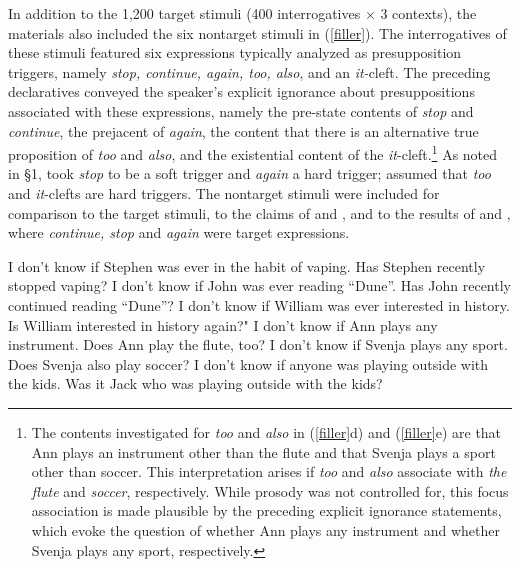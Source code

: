 \documentclass[11pt,fleqn]{article}
\newcommand{\6}{\mbox{$[\hspace*{-.6mm}[$}}
\newcommand{\9}{\mbox{$]\hspace*{-.6mm}]$}}
\begin{document}
In addition to the 1,200 target stimuli (400 interrogatives $\times$ 3 contexts), the materials also included the six nontarget stimuli in (\ref{filler}). The interrogatives of these stimuli featured six expressions typically analyzed as presupposition triggers, namely {\em stop, continue, again, too, also}, and an {\em it-}cleft. The preceding declaratives conveyed the speaker's explicit ignorance about presuppositions associated with these expressions, namely the pre-state contents of \emph{stop} and \emph{continue}, the prejacent of \emph{again}, the content that there is an alternative true proposition of \emph{too} and \emph{also}, and the existential content of the \emph{it}-cleft.\footnote{The contents investigated for {\em too} and {\em also} in (\ref{filler}d) and (\ref{filler}e) are that Ann plays an instrument other than the flute and that Svenja plays a sport other than soccer. This interpretation arises if {\em too} and {\em also} associate with {\em the flute} and {\em soccer}, respectively. While prosody was not controlled for, this focus association is made plausible by the preceding explicit ignorance statements, which evoke the question of whether Ann plays any instrument and whether Svenja plays any sport, respectively.}  As noted in \S1, \citealt{simons01} took {\em stop} to be a soft trigger and \emph{again} a hard trigger; \citealt{abusch10} assumed that \emph{too} and \emph{it}-clefts are hard triggers. The nontarget stimuli were included for comparison to the target stimuli, to the claims of \citealt{simons01} and \citealt{abusch10}, and to the results of \citealt[Exp.~3]{mandelkern-etal2020} and \citealt[Exps.~1-2]{kalomoiros-schwarz2024}, where  \emph{continue, stop} and \emph{again} were target expressions. 


\begin{exe}
\ex\label{filler} 
\begin{xlist}
\ex I don't know if Stephen was ever in the habit of vaping. Has Stephen recently stopped vaping?
\ex I don't know if John was ever reading ``Dune''. Has John recently continued reading ``Dune''?
\ex I don't know if William was ever interested in history. Is William interested in history again?"
\ex I don't know if Ann plays any instrument. Does Ann play the flute, too?
\ex I don't know if Svenja plays any sport. Does Svenja also play soccer?
\ex I don't know if anyone was playing outside with the kids. Was it Jack who was playing outside with the kids?

\end{xlist}
\end{exe}
\end{document}
